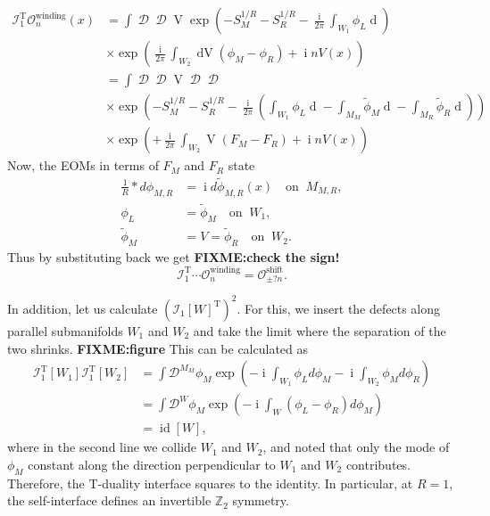 \documentclass[11pt,toc=bibliography]{scrbook}
\DeclareMathOperator{\imunit}{i}
\DeclareMathOperator{\id}{id}
\numberwithin{equation}{section}
\DeclareMathOperator{\imunit}{i}
\DeclareMathOperator{\id}{id}
\begin{document}
\[
\begin{aligned}
\mathcal{I}_1^\text{T} \mathcal{O}^\text{winding}_n(x)
&= \int \mathop{\mathcal{D}\phi_M}\mathop{\mathcal{D}\phi_R}\mathop{\mathcal{D}^{W_2}V}
\exp\left(-S_M^{1/R}-S_R^{1/R}-\frac{\imunit}{2\pi}\int_{W_1}\phi_L \mathop{d\phi_M}\right)\\
 &\times\exp\left(\frac{\imunit}{2\pi}\int_{W_2}\mathop{dV}(\phi_M-\phi_R) + \imunit n V(x) \right)\\
&= \int \mathop{\mathcal{D}F_M}\mathop{\mathcal{D}F_R}\mathop{\mathcal{D}^{W_2}V}\mathop{\mathcal{D}\widetilde\phi_M}\mathop{\mathcal{D}\widetilde\phi_R}\\
&\times\exp\left(-S_M^{1/R}-S_R^{1/R}-\frac{\imunit}{2\pi}(\int_{W_1}\phi_L \mathop{d\phi_M}-\int_{M_M}\tilde{\phi}_M\mathop{dF_M} - \int_{M_R}\tilde{\phi}_R\mathop{dF_R})\right)\\
 &\times\exp\left(+\frac{\imunit}{2\pi}\int_{W_2}\mathop{V}(F_M-F_R) + \imunit n V(x) \right)
\end{aligned}
\] Now, the EOMs in terms of \(F_M\) and \(F_R\) state \[
\begin{aligned}
    \frac{1}{R} *d\phi_{M,R} &= \imunit d\widetilde\phi_{M,R}(x) \quad \text{on} \;\; M_{M,R}, \\
    \phi_L &= \widetilde{\phi}_M \quad \text{on} \;\; W_1,\\
\tilde{\phi}_M &= V = \tilde{\phi}_R \quad \text{on} \;\; W_2.
\end{aligned}
\] Thus by substituting back we get \textbf{FIXME:check the sign!} \[
\mathcal{I}_1^\text{T}\cdots\mathcal{O}_n^\text{winding} = \mathcal{O}_{\pm? n}^\text{shift}.
\]

In addition, let us calculate \((\mathcal{I}_1[W]^\text{T})^2\). For
this, we insert the defects along parallel submanifolds \(W_1\) and
\(W_2\) and take the limit where the separation of the two shrinks.
\textbf{FIXME:figure} This can be calculated as \[
\begin{aligned}
\mathcal{I}_1^\text{T}[W_1]\mathcal{I}_1^\text{T}[W_2]
&= \int \mathcal{D}^{M_M}\phi_M \exp(-\imunit \int_{W_1} \phi_L d\phi_M - \imunit\int_{W_2} \phi_M d\phi_R)\\
&= \int \mathcal{D}^{W}\phi_M \exp(-\imunit \int_{W} (\phi_L - \phi_R) d\phi_M)\\
&= \id[W],
\end{aligned}
\] where in the second line we collide \(W_1\) and \(W_2\), and noted
that only the mode of \(\phi_M\) constant along the direction
perpendicular to \(W_1\) and \(W_2\) contributes. Therefore, the
T-duality interface squares to the identity. In particular, at \(R=1\),
the self-interface defines an invertible \(\mathbb{Z}_2\) symmetry.
\end{document}

